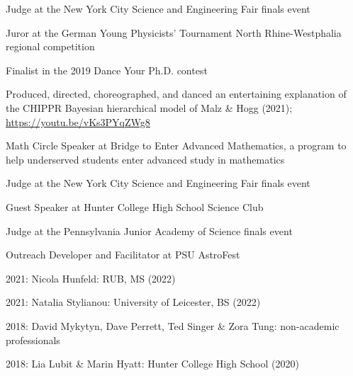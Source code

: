 \documentclass[12pt,letterpaper]{article}
\begin{document}
\begin{list}{}{\malzlist}
\item Judge at the New York City Science and Engineering Fair finals event %
\item Juror at the German Young Physicists' Tournament North Rhine-Westphalia regional competition %
\item Finalist in the 2019 Dance Your Ph.D. contest %
  \begin{list}{}{\malzlist}
  \item Produced, directed, choreographed, and danced an entertaining explanation of the CHIPPR Bayesian hierarchical model of Malz \& Hogg (2021); \href{https://youtu.be/vKs3PYqZWg8}{https://youtu.be/vKs3PYqZWg8}
    \end{list}
\item Math Circle Speaker at Bridge to Enter Advanced Mathematics, a program to help underserved students enter advanced study in mathematics %
  \begin{list}{}{\malzlist}
  \item {}%
  \end{list}
\item Judge at the New York City Science and Engineering Fair finals event %
\item Guest Speaker at Hunter College High School Science Club %
\item Judge at the Pennsylvania Junior Academy of Science finals event %
\item Outreach Developer and Facilitator at PSU AstroFest 
  \begin{list}{}{\malzlist}
    \item {}%
  \end{list}
\end{list}

\begin{list}{}{\malzlist}
	\item 2021: Nicola Hunfeld: RUB, MS (2022)
	\item 2021: Natalia Stylianou: University of Leicester, BS (2022)
	\item 2018: David Mykytyn, Dave Perrett, Ted Singer \& Zora Tung: non-academic professionals
	\item 2018: Lia Lubit \& Marin Hyatt: Hunter College High School (2020)
\end{list}
\end{document}
